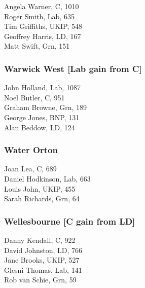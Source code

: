 \documentclass[a4paper,openany,10pt]{book}
\begin{document}
Angela Warner, C, 1010\\
Roger Smith, Lab, 635\\
Tim Griffiths, UKIP, 548\\
Geoffrey Harris, LD, 167\\
Matt Swift, Grn, 151\\


\subsubsection*{Warwick West \hspace*{\fill}\nolinebreak[1]%
\enspace\hspace*{\fill}
[Lab gain from C]}



John Holland, Lab, 1087\\
Noel Butler, C, 951\\
Graham Browne, Grn, 189\\
George Jones, BNP, 131\\
Alan Beddow, LD, 124\\


\subsubsection*{Water Orton}



Joan Lea, C, 689\\
Daniel Hodkinson, Lab, 663\\
Louis John, UKIP, 455\\
Sarah Richards, Grn, 64\\


\subsubsection*{Wellesbourne \hspace*{\fill}\nolinebreak[1]%
\enspace\hspace*{\fill}
[C gain from LD]}



Danny Kendall, C, 922\\
David Johnston, LD, 766\\
Jane Brooks, UKIP, 527\\
Glesni Thomas, Lab, 141\\
Rob van Schie, Grn, 59\\
\end{document}

